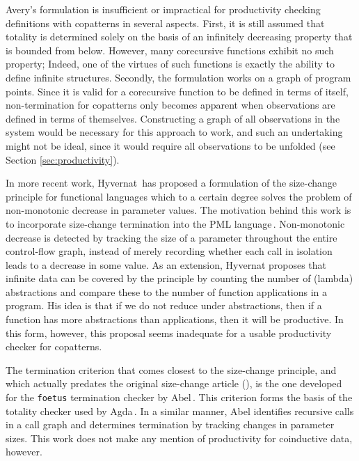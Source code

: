 Avery's formulation is insufficient or impractical for productivity checking definitions with copatterns in several aspects. First, it is still assumed that totality is determined solely on the basis of an infinitely decreasing property that is bounded from below. However, many corecursive functions exhibit no such property; Indeed, one of the virtues of such functions is exactly the ability to define infinite structures. Secondly, the formulation works on a graph of program points. Since it is valid for a corecursive function to be defined in terms of itself, non-termination for copatterns only becomes apparent when observations are defined in terms of themselves. Constructing a graph of all observations in the system would be necessary for this approach to work, and such an undertaking might not be ideal, since it would require all observations to be unfolded (see Section \ref{sec:productivity}).

In more recent work, Hyvernat\,\citep{Hyvernat13} has proposed a formulation of the size-change principle for functional languages which to a certain degree solves the problem of non-monotonic decrease in parameter values. The motivation behind this work is to incorporate size-change termination into the PML language\,\cite{PMLLanguage}. Non-monotonic decrease is detected by tracking the size of a parameter throughout the entire control-flow graph, instead of merely recording whether each call in isolation leads to a decrease in some value. As an extension, Hyvernat proposes that infinite data can be covered by the principle by counting the number of (lambda) abstractions and compare these to the number of function applications in a program. His idea is that if we do not reduce under abstractions, then if a function has more abstractions than applications, then it will be productive. In this form, however, this proposal seems inadequate for a usable productivity checker for copatterns.

The termination criterion that comes closest to the size-change principle, and which actually predates the original size-change article (\citep{LeeJones01SizeChange}), is the one developed for the \texttt{foetus} termination checker by Abel\,\citep{Abel98foetus}. This criterion forms the basis of the totality checker used by Agda\,\citep{Norell:thesis}. In a similar manner, Abel identifies recursive calls in a call graph and determines termination by tracking changes in parameter sizes. This work does not make any mention of productivity for coinductive data, however.

